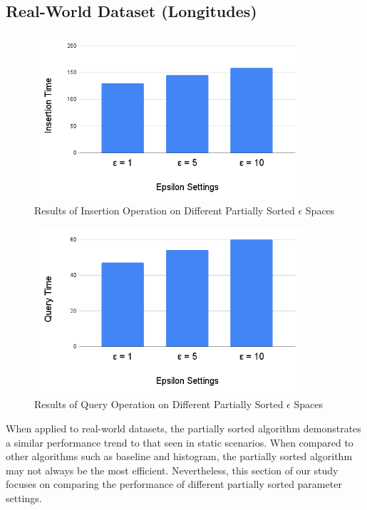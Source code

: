 \subsection{Real-World Dataset (Longitudes)} 
\begin{figure}[H]
    \centering
    \includegraphics[width=100mm,scale=1]{Figures/InsertionLogEp.png}
    \caption{
     Results of Insertion Operation on Different Partially Sorted $\epsilon$ Spaces 
    }
    \label{fig:InsertionLogEp}
\end{figure}
\begin{figure}[H]
    \centering
    \includegraphics[width=100mm,scale=1]{Figures/QueryLogEp.png}
    \caption{
     Results of Query Operation on Different Partially Sorted $\epsilon$ Spaces 
    }
    \label{fig:QueryLogEp}
\end{figure}
When applied to real-world datasets, the partially sorted algorithm demonstrates a similar performance trend to that seen in static scenarios. When compared to other algorithms such as baseline and histogram, the partially sorted algorithm may not always be the most efficient. Nevertheless, this section of our study focuses on comparing the performance of different partially sorted parameter settings.

